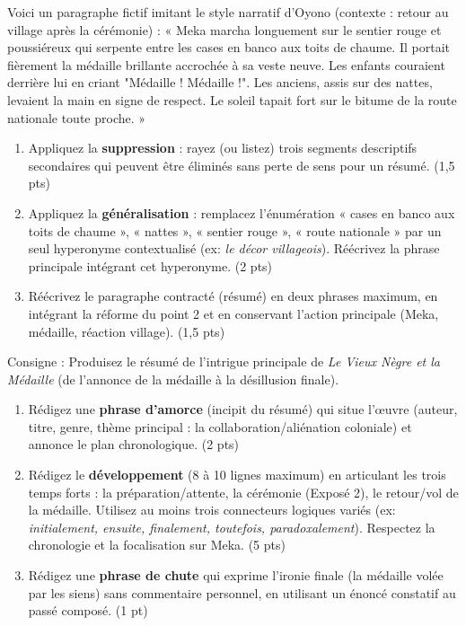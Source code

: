 \documentclass[11pt]{article}
\begin{document}
\begin{exercice}
Voici un paragraphe fictif imitant le style narratif d'Oyono (contexte : retour au village après la cérémonie) : 
« Meka marcha longuement sur le sentier rouge et poussiéreux qui serpente entre les cases en banco aux toits de chaume. Il portait fièrement la médaille brillante accrochée à sa veste neuve. Les enfants couraient derrière lui en criant "Médaille ! Médaille !". Les anciens, assis sur des nattes, levaient la main en signe de respect. Le soleil tapait fort sur le bitume de la route nationale toute proche. »
\begin{enumerate}
    \item Appliquez la \textbf{suppression} : rayez (ou listez) trois segments descriptifs secondaires qui peuvent être éliminés sans perte de sens pour un résumé. (1,5 pts)
    \item Appliquez la \textbf{généralisation} : remplacez l'énumération « cases en banco aux toits de chaume », « nattes », « sentier rouge », « route nationale » par un seul hyperonyme contextualisé (ex: \textit{le décor villageois}). Réécrivez la phrase principale intégrant cet hyperonyme. (2 pts)
    \item Réécrivez le paragraphe contracté (résumé) en deux phrases maximum, en intégrant la réforme du point 2 et en conservant l'action principale (Meka, médaille, réaction village). (1,5 pts)
\end{enumerate}
\end{exercice}

\begin{exercice}
Consigne : Produisez le résumé de l'intrigue principale de \textit{Le Vieux Nègre et la Médaille} (de l'annonce de la médaille à la désillusion finale).
\begin{enumerate}
    \item Rédigez une \textbf{phrase d'amorce} (incipit du résumé) qui situe l'œuvre (auteur, titre, genre, thème principal : la collaboration/aliénation coloniale) et annonce le plan chronologique. (2 pts)
    \item Rédigez le \textbf{développement} (8 à 10 lignes maximum) en articulant les trois temps forts : la préparation/attente, la cérémonie (Exposé 2), le retour/vol de la médaille. Utilisez au moins trois connecteurs logiques variés (ex: \textit{initialement, ensuite, finalement, toutefois, paradoxalement}). Respectez la chronologie et la focalisation sur Meka. (5 pts)
    \item Rédigez une \textbf{phrase de chute} qui exprime l'ironie finale (la médaille volée par les siens) sans commentaire personnel, en utilisant un énoncé constatif au passé composé. (1 pt)
\end{enumerate}
\end{exercice}
\end{document}
